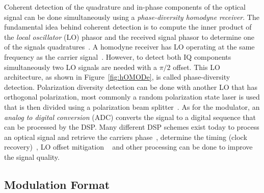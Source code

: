 Coherent detection of the quadrature and in-phase components of the optical signal can be done simultaneously using a \textit{phase-diversity homodyne receiver}. The fundamental idea behind coherent detection is to compute the inner product of the \textit{local oscillator} (LO) phasor and the received signal phasor to determine one of the signals quadratures~\cite{kikuchi2015fundamentals}. A homodyne  receiver has LO operating at the same frequency as the carrier signal~\cite{FiberAgrawal}. However, to detect both IQ components simultaneously two LO signals are needed with a $\pi/2$ offset. This LO architecture, as shown in Figure~\ref{fig:hOMODe}, is called phase-diversity detection. Polarization diversity detection can be done with another LO that has orthogonal polarization, most commonly a random polarization state laser is used that is then divided using a polarization beam splitter~\cite{kikuchi2015fundamentals}. As for the modulator, an \textit{analog to digital conversion} (ADC) converts the signal to a digital sequence that can be processed by the DSP. Many different DSP schemes exist today to process an optical signal and retrieve the carriers phase~\cite{kuschnerov2009dsp}, determine the timing (clock recovery)~\cite{stojanovic2011clock}, LO offset mitigation ~\cite{kikuchi2015fundamentals,kuschnerov2009dsp} and other processing can be done to improve the signal quality.





\subsection{Modulation Format}

